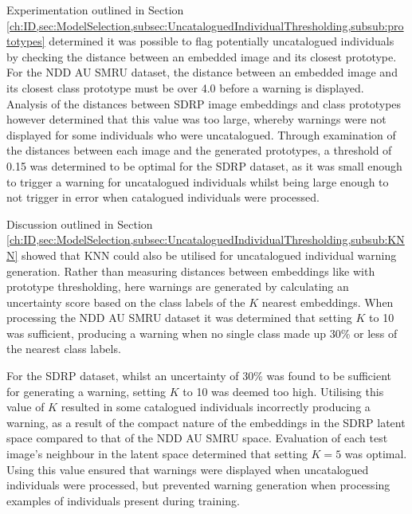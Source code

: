 Experimentation outlined in Section \ref{ch:ID,sec:ModelSelection,subsec:UncataloguedIndividualThresholding,subsub:prototypes} determined it was possible to flag potentially uncatalogued individuals by checking the distance between an embedded image and its closest prototype. For the NDD AU SMRU dataset, the distance between an embedded image and its closest class prototype must be over 4.0 before a warning is displayed. Analysis of the distances between SDRP image embeddings and class prototypes however determined that this value was too large, whereby warnings were not displayed for some individuals who were uncatalogued. Through examination of the distances between each image and the generated prototypes, a threshold of 0.15 was determined to be optimal for the SDRP dataset, as it was small enough to trigger a warning for uncatalogued individuals whilst being large enough to not trigger in error when catalogued individuals were processed.


Discussion outlined in Section \ref{ch:ID,sec:ModelSelection,subsec:UncataloguedIndividualThresholding,subsub:KNN} showed that KNN could also be utilised for uncatalogued individual warning generation. Rather than measuring distances between embeddings like with prototype thresholding, here warnings are generated by calculating an uncertainty score based on the class labels of the $K$ nearest embeddings. When processing the NDD AU SMRU dataset it was determined that setting $K$ to 10 was sufficient, producing a warning when no single class made up 30\% or less of the nearest class labels. 

For the SDRP dataset, whilst an uncertainty of 30\% was found to be sufficient for generating a warning, setting $K$ to 10 was deemed too high. Utilising this value of $K$ resulted in some catalogued individuals incorrectly producing a warning, as a result of the compact nature of the embeddings in the SDRP latent space compared to that of the NDD AU SMRU space. Evaluation of each test image's neighbour in the latent space determined that setting $K = 5$ was optimal. Using this value ensured that warnings were displayed when uncatalogued individuals were processed, but prevented warning generation when processing examples of individuals present during training. 

